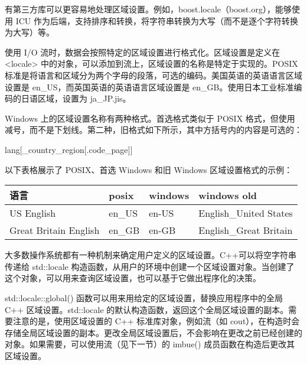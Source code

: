 有第三方库可以更容易地处理区域设置。例如，boost.locale（boost.org），能够使用 ICU 作为后端，支持排序和转换，将字符串转换为大写（而不是逐个字符转换为大写）等。


使用 I/O 流时，数据会按照特定的区域设置进行格式化。区域设置是定义在 <locale> 中的对象，可以添加到流上，区域设置的名称是特定于实现的。POSIX 标准是将语言和区域分为两个字母的段落，可选的编码。美国英语的英语语言区域设置是 en\_US，而英国英语的英语语言区域设置是 en\_GB。使用日本工业标准编码的日语区域，设置为 ja\_JP.jis。

Windows 上的区域设置名称有两种格式。首选格式类似于 POSIX 格式，但使用减号，而不是下划线。第二种，旧格式如下所示，其中方括号内的内容是可选的：

\begin{cpp}
lang[_country_region[.code_page]]
\end{cpp}

以下表格展示了 POSIX、首选 Windows 和旧 Windows 区域设置格式的示例：

\begin{longtable}{|l|l|l|l|}
\hline
\textbf{语言}     & \textbf{posix} & \textbf{windows} & \textbf{windows old}   \\ \hline
\endfirsthead
%
\endhead
%
US English            & en\_US         & en-US            & English\_United States \\ \hline
Great Britain English & en\_GB         & en-GB            & English\_Great Britain \\ \hline
\end{longtable}

大多数操作系统都有一种机制来确定用户定义的区域设置。C++可以将空字符串传递给 std::locale 构造函数，从用户的环境中创建一个区域设置对象。当创建了这个对象，可以用来查询区域设置，也可以基于它做出程序化的决策。


std::locale::global() 函数可以用来用给定的区域设置，替换应用程序中的全局 C++ 区域设置。std::locale 的默认构造函数，返回这个全局区域设置的副本。需要注意的是，使用区域设置的 C++ 标准库对象，例如流（如 cout），在构造时会存储全局区域设置的副本。更改全局区域设置后，不会影响在更改之前已经创建的对象。如果需要，可以使用流（见下一节）的 imbue() 成员函数在构造后更改其区域设置。

